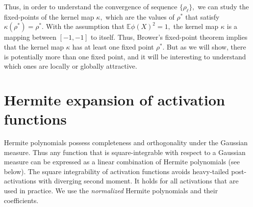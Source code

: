 \documentclass[twoside]{article}
\newcommand{\E}{\mathbb{E}}
\theoremstyle{definition}
\newcommand{\thomas}[1]{{\color{blue}TH:  \textit{#1}}}
\begin{document}







Thus, in order to understand the convergence of sequence $\{\rho_\ell\},$ we can study the fixed-points of the kernel map $\kappa,$
which are the values of $\rho^*$ that satisfy $\kappa(\rho^*) = \rho^*.$ With the assumption that $\E \phi(X)^2=1,$ the kernel map $\kappa$ is a mapping between $[-1,-1]$ to itself. Thus, Brower's fixed-point theorem implies that the kernel map $\kappa$ has at least one fixed point $\rho^*.$ But as we will show, there is potentially more than one fixed point, and it will be interesting to understand which ones are locally or globally attractive. 


\section{Hermite expansion of activation functions}
Hermite polynomials possess completeness and orthogonality under the Gaussian measure. Thus any function that is square-integrable with respect to a Gaussian measure can be expressed as a linear combination of Hermite polynomials (see below). The square integrability of activation functions avoids heavy-tailed post-activations with diverging second moment. It holds for all activations that are used in practice. We use the \emph{normalized} Hermite polynomials and their coefficients. 
\end{document}
